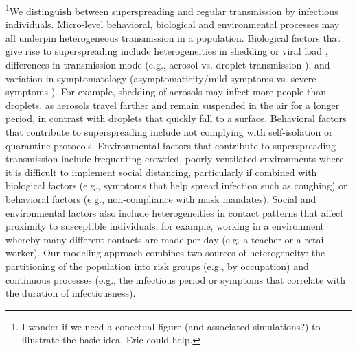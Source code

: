 \documentclass{imammb}
\numberwithin{equation}{section}
\begin{document}
\footnote{I wonder if we need a concetual figure (and associated simulations?) to illustrate the basic idea. Eric could help. }We distinguish between superspreading and regular transmission  by infectious individuals.  Micro-level behavioral, biological and environmental processes may all underpin heterogeneous transmission in a population. Biological factors that give rise to superspreading include heterogeneities in shedding or viral load \citep{Goyal2021-xr}, differences in transmission mode (e.g., aerosol vs. droplet transmission \citep{Chen2021-wo}), and variation in symptomatology (asymptomaticity/mild symptoms vs. severe symptoms \citep{ Illingworth2021-rz}). For example, shedding of aerosols may infect more people than droplets, as aerosols travel farther and remain suspended in the air for a longer period, in contrast with droplets that quickly fall to a surface. Behavioral factors that contribute to superspreading include not complying with self-isolation or quarantine protocols. Environmental factors that contribute to superspreading transmission include frequenting crowded, poorly ventilated environments where it is difficult to implement social distancing, particularly if combined with biological factors (e.g., symptoms that help spread infection such as coughing) or behavioral factors (e.g., non-compliance with mask mandates). Social and environmental factors also include heterogeneities in contact patterns that affect proximity to susceptible individuals, for example,  working in a environment whereby many different contacts are made per day (e.g. a teacher or a retail worker). Our modeling approach combines two sources of heterogeneity: the partitioning of the population into risk groups (e.g., by occupation) and continuous processes (e.g., the infectious period or symptoms that correlate with the duration of infectiousness).   


\end{document}
